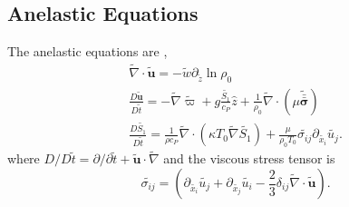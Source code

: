 \documentclass[twocolumn, amsmath, amsfonts, amssymb, trackchanges]{aastex62}
\newcommand{\td}[1]{\ensuremath{\widetilde{#1}}}
\newcommand{\grad}{\ensuremath{\nabla}}
\newcommand{\lilstressT}{\ensuremath{\bm{\bar{\bar{\sigma}}}}}
\begin{document}
\subsection{Anelastic Equations}
The anelastic equations are \citep{lecoanet&all2014},
\begin{gather}
\td{\grad}\cdot\td{\bm{u}} = -\td{w}\partial_{\tilde{z}} \ln\rho_0 \\
\frac{D \td{\bm{u}}}{D \td{t}} = -\td{\grad} \td{\varpi} + g\frac{\td{S_1}}{c_P}\hat{z} + \frac{1}{\rho_0}\td{\grad}\cdot\left(\mu\td{\lilstressT}\right) \\
\frac{D \td{S_1}}{D\td{t}} = \frac{1}{\rho c_P}\td{\grad}\cdot\left(\kappa T_0 \td{\grad} \td{S_1}\right) + \frac{\mu}{\rho_0 T_0}\td{\sigma_{ij}}\partial_{\td{x_i}}\td{u_j}.
\end{gather}
where $D/D\td{t} = \partial/\partial \td{t} + \td{\bm{u}}\cdot\td{\grad}$ and the viscous stress tensor is
\begin{equation}
\td{\sigma_{ij}} = \left(\partial_{\td{x_i}}\td{u_j} + \partial_{\td{x_j}}\td{u_i} - \frac{2}{3}\delta_{ij}\td{\grad}\cdot\td{\bm{u}}\right).
\end{equation}
\end{document}
